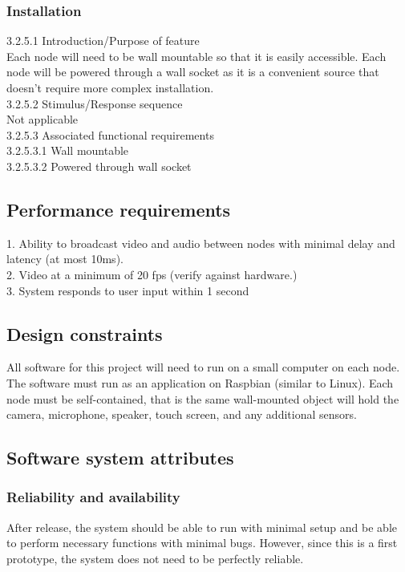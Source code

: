 \documentclass[onecolumn, draftclsnofoot,10pt, compsoc]{IEEEtran}
\newcommand\tab[1][1cm]{\hspace*{#1}}
\begin{document}
\subsubsection{Installation}
\tab 3.2.5.1  Introduction/Purpose of feature \\
\tab Each node will need to be wall mountable so that it is easily accessible. Each node will be powered through a wall socket as it is a convenient source that doesn’t require more complex installation. \\
\tab 3.2.5.2  Stimulus/Response sequence \\
\tab Not applicable \\ 
\tab 3.2.5.3  Associated functional requirements \\
\tab \tab 3.2.5.3.1  Wall mountable \\
\tab \tab 3.2.5.3.2  Powered through wall socket

\subsection{Performance requirements}
1. Ability to broadcast video and audio between nodes with minimal delay and latency (at most 10ms). \\
2. Video at a minimum of 20 fps (verify against hardware.) \\
3. System responds to user input within 1 second

\subsection{Design constraints}
All software for this project will need to run on a small computer on each node. The software must run as an application on Raspbian (similar to Linux). Each node must be self-contained, that is the same wall-mounted object will hold the camera, microphone, speaker, touch screen, and any additional sensors.

\subsection{Software system attributes}

\subsubsection{Reliability and availability}
After release, the system should be able to run with minimal setup and be able to perform necessary functions with minimal bugs. However, since this is a first prototype, the system does not need to be perfectly reliable.
\end{document}
